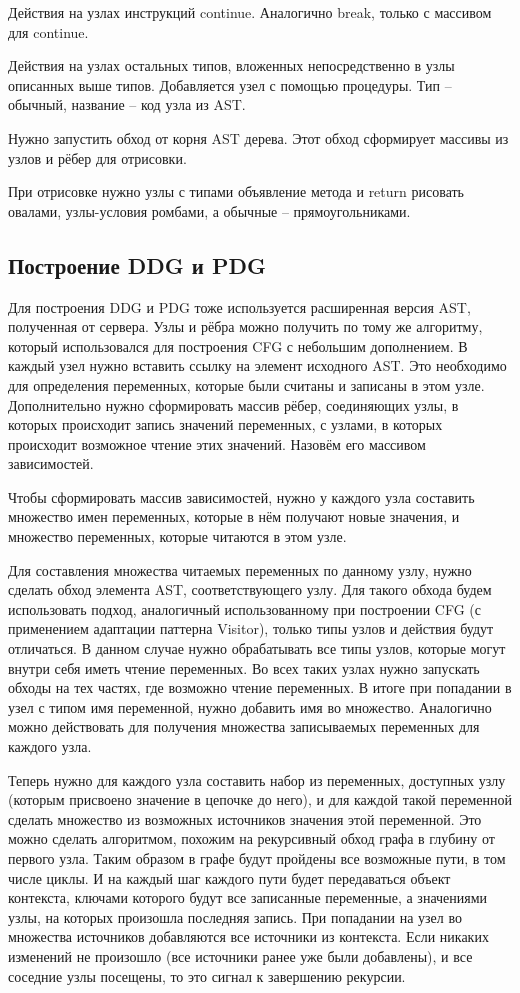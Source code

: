Действия на узлах инструкций continue. Аналогично break, только с массивом для continue.

Действия на узлах остальных типов, вложенных непосредственно в узлы описанных выше типов. Добавляется узел с помощью процедуры. Тип – обычный, название – код узла из AST.

Нужно запустить обход от корня AST дерева. Этот обход сформирует массивы из узлов и рёбер для отрисовки.

При отрисовке нужно узлы с типами объявление метода и return рисовать овалами, узлы-условия ромбами, а обычные – прямоугольниками.

\subsection{Построение DDG и PDG} \label{ch2:subsec-title-abbr}

Для построения DDG и PDG тоже используется расширенная версия AST, полученная от сервера. Узлы и рёбра можно получить по тому же алгоритму, который использовался для построения CFG с небольшим дополнением. В каждый узел нужно вставить ссылку на элемент исходного AST. Это необходимо для определения переменных, которые были считаны и записаны в этом узле. Дополнительно нужно сформировать массив рёбер, соединяющих узлы, в которых происходит запись значений переменных, с узлами, в которых происходит возможное чтение этих значений. Назовём его массивом зависимостей.

Чтобы сформировать массив зависимостей, нужно у каждого узла составить множество имен переменных, которые в нём получают новые значения, и множество переменных, которые читаются в этом узле.

Для составления множества читаемых переменных по данному узлу, нужно сделать обход элемента AST, соответствующего узлу. Для такого обхода будем использовать подход, аналогичный использованному при построении CFG (с применением адаптации паттерна Visitor), только типы узлов и действия будут отличаться. В данном случае нужно обрабатывать все типы узлов, которые могут внутри себя иметь чтение переменных. Во всех таких узлах нужно запускать обходы на тех частях, где возможно чтение переменных. В итоге при попадании в узел с типом имя переменной, нужно добавить имя во множество. Аналогично можно действовать для получения множества записываемых переменных для каждого узла.

Теперь нужно для каждого узла составить набор из переменных, доступных узлу (которым присвоено значение в цепочке до него), и для каждой такой переменной сделать множество из возможных источников значения этой переменной. Это можно сделать алгоритмом, похожим на рекурсивный обход графа в глубину от первого узла. Таким образом в графе будут пройдены все возможные пути, в том числе циклы. И на каждый шаг каждого пути будет передаваться объект контекста, ключами которого будут все записанные переменные, а значениями узлы, на которых произошла последняя запись. При попадании на узел во множества источников добавляются все источники из контекста. Если никаких изменений не произошло (все источники ранее уже были добавлены), и все соседние узлы посещены, то это сигнал к завершению рекурсии.

